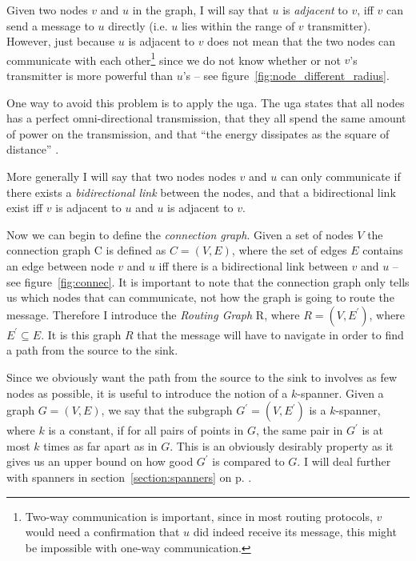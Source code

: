 
Given two nodes $v$ and $u$ in the graph, I will say that $u$ is \emph{adjacent} to $v$, iff $v$ can send a message to $u$ directly (i.e. $u$ lies within the range of $v$ transmitter). However, just because $u$ is adjacent to $v$ does not mean that the two nodes can communicate with each other\footnote{Two-way communication is important, since in most routing protocols, $v$ would need a confirmation that $u$ did indeed receive its message, this might be impossible with one-way communication.} since we do not know whether or not $v$'s transmitter is more powerful than $u$'s -- see figure~\ref{fig:node_different_radius}. 

One way to avoid this problem is to apply the \ac{uga}. The \ac{uga} states that all nodes has a perfect omni-directional transmission, that they all spend the same amount of power on the transmission, and that ``the energy dissipates as the square of distance'' \cite{practical}.

More generally I will say that two nodes nodes $v$ and $u$ can only communicate if there exists a \emph{bidirectional link} between the nodes, and that a bidirectional link exist iff $v$ is adjacent to $u$ and $u$ is adjacent to $v$.

Now we can begin to define the \emph{connection graph}. Given a set of nodes $V$ the connection graph C is defined as $C = (V, E)$, where the set of edges $E$ contains an edge between node $v$ and $u$ iff there is a bidirectional link between $v$ and $u$ -- see figure~\ref{fig:connec}. It is important to note that the connection graph only tells us which nodes that can communicate, not how the graph is going to route the message. Therefore I introduce the \emph{Routing Graph} R, where $R = (V, E^{\prime})$, where $E^{\prime} \subseteq E$. It is this graph $R$ that the message will have to navigate in order to find a path from the source to the sink.

Since we obviously want the path from the source to the sink to involves as few nodes as possible, it is useful to introduce the notion of a $k$-spanner. Given a graph $G = (V, E)$, we say that the subgraph $G^{\prime} = (V, E^{\prime})$ is a $k$-spanner, where $k$ is a constant, if for all pairs of points in $G$, the same pair in $G^{\prime}$ is at most $k$ times as far apart as in $G$. This is an obviously desirably property as it gives us an upper bound on how good $G^{\prime}$ is compared to $G$. I will deal further with spanners in section~\ref{section:spanners} on p. \pageref{section:spanners}.

